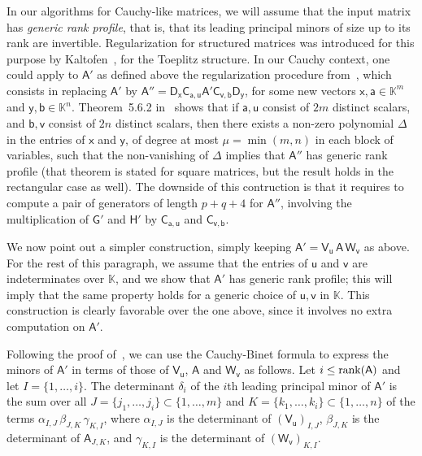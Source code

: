 \documentclass{sig-alternate}
\newcommand{\va}{\ensuremath{\mathsf{a}}}
\newcommand{\vb}{\ensuremath{\mathsf{b}}}
\newcommand{\vu}{\ensuremath{\mathsf{u}}}
\newcommand{\vv}{\ensuremath{\mathsf{v}}}
\newcommand{\vx}{\ensuremath{\mathsf{x}}}
\newcommand{\vy}{\ensuremath{\mathsf{y}}}
\newcommand{\mA}{\ensuremath{\mathsf{A}}}
\newcommand{\mC}{\ensuremath{\mathsf{C}}}
\newcommand{\mD}{\ensuremath{\mathsf{D}}}
\newcommand{\mG}{\ensuremath{\mathsf{G}}}
\newcommand{\mH}{\ensuremath{\mathsf{H}}}
\newcommand{\mV}{\ensuremath{\mathsf{V}}}
\newcommand{\mW}{\ensuremath{\mathsf{W}}}
\newcommand{\K}{\ensuremath{\mathbb{K}}}
\begin{document}
\smallskip{}  In our algorithms for
Cauchy-like matrices, we will assume that the input matrix has {\em
  generic rank profile}, that is, that its leading principal minors of
size up to its rank are invertible.  Regularization for structured
matrices was introduced for this purpose by
Kaltofen~\cite{Kaltofen94}, for the Toeplitz structure. In our Cauchy
context, one could apply to $\mA'$ as defined above the regularization
procedure from~\cite[Section~5.6]{Pan01}, which consists in replacing
$\mA'$ by $\mA'' = \mD_\vx \mC_{\va,\vu} \mA' \mC_{\vv,\vb}\mD_\vy$,
for some new vectors $\vx,\va \in \K^m$ and $\vy,\vb \in
\K^n$. Theorem~5.6.2 in~\cite{Pan01} shows that if $\va,\vu$ consist
of $2m$ distinct scalars, and $\vb,\vv$ consist of $2n$ distinct
scalars, then there exists a non-zero polynomial $\Delta$ in the
entries of $\vx$ and $\vy$, of degree at most $\mu=\min(m,n)$ in each
block of variables, such that the non-vanishing of $\Delta$ implies
that $\mA''$ has generic rank profile (that theorem is stated for
square matrices, but the result holds in the rectangular case as
well).  The downside of this contruction is that it requires to
compute a pair of generators of length $p+q+4$ for $\mA''$, involving
the multiplication of $\mG'$ and $\mH'$ by $\mC_{\va,\vu}$ and
$\mC_{\vv,\vb}$.

We now point out a simpler construction, simply keeping $\mA' =
\mV_\vu\, \mA\, \mW_\vv$ as above. For the rest of this paragraph, we
assume that the entries of $\vu$ and $\vv$ are indeterminates over
$\K$, and we show that $\mA'$ has generic rank profile; this will
imply that the same property holds for a generic choice of $\vu,\vv$
in $\K$. This construction is clearly favorable over the one above,
since it involves no extra computation on $\mA'$.

Following the proof of~\cite[Theorem~5.6.2]{Pan01}, we can use the
Cauchy-Binet formula to express the minors of $\mA'$ in terms of those
of $\mV_\vu$, $\mA$ and $\mW_\vv$ as follows. Let $i \le {\rm
  rank}(\mA)$ and let $I=\{1,\dots,i\}$. The determinant $\delta_i$ of
the $i$th leading principal minor of $\mA'$ is the sum over all
$J=\{j_1,\dots,j_i\} \subset \{1,\dots,m\}$ and $K=\{k_1,\dots,k_i\}
\subset \{1,\dots,n\}$ of the terms $\alpha_{I,J}\, \beta_{J,K}\,
\gamma_{K,I}$, where $\alpha_{I,J}$ is the determinant of
$(\mV_\vu)_{I,J}$, $\beta_{J,K}$ is the determinant of $\mA_{J,K}$,
and $\gamma_{K,I}$ is the determinant of $(\mW_\vv)_{K,I}$.
\end{document}
